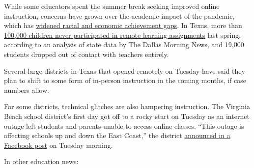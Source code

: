 While some educators spent the summer break seeking improved online
instruction, concerns have grown over the academic impact of the
pandemic, which has
\href{https://www.nytimes3xbfgragh.onion/2020/06/05/us/coronavirus-education-lost-learning.html}{widened
racial and economic achievement gaps}. In Texas, more than
\href{https://www.dallasnews.com/news/education/2020/09/02/thousands-of-north-texas-children-could-be-among-the-lost-generation-of-students-after-they-stopped-participating-in-online-learning/}{100,000
children never participated in remote learning assignments} last spring,
according to an analysis of state data by The Dallas Morning News, and
19,000 students dropped out of contact with teachers entirely.

Several large districts in Texas that opened remotely on Tuesday have
said they plan to shift to some form of in-person instruction in the
coming months, if case numbers allow.

For some districts, technical glitches are also hampering instruction.
The Virginia Beach school district's first day got off to a rocky start
on Tuesday as an internet outage left students and parents unable to
access online classes. ``This outage is affecting schools up and down
the East Coast,'' the district
\href{https://www.facebookcorewwwi.onion/VBSchools}{announced in a
Facebook post} on Tuesday morning.

In other education news:


